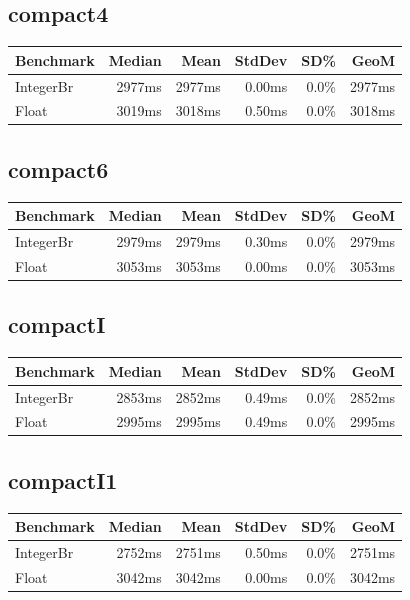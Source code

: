 {\subsection*{compact4}
\begin{tabular}{|l|r|r|r|r|r|}
\hline
\textbf{Benchmark} & \textbf{Median} & \textbf{Mean} & \textbf{StdDev} & \textbf{SD\%} & \textbf{GeoM} \\ \hline
IntegerBr & 2977ms & 2977ms & 0.00ms & 0.0\% & 2977ms \\ \hline
Float & 3019ms & 3018ms & 0.50ms & 0.0\% & 3018ms \\ \hline
\end{tabular}

\subsection*{compact6}
\begin{tabular}{|l|r|r|r|r|r|}
\hline
\textbf{Benchmark} & \textbf{Median} & \textbf{Mean} & \textbf{StdDev} & \textbf{SD\%} & \textbf{GeoM} \\ \hline
IntegerBr & 2979ms & 2979ms & 0.30ms & 0.0\% & 2979ms \\ \hline
Float & 3053ms & 3053ms & 0.00ms & 0.0\% & 3053ms \\ \hline
\end{tabular}

\subsection*{compactI}
\begin{tabular}{|l|r|r|r|r|r|}
\hline
\textbf{Benchmark} & \textbf{Median} & \textbf{Mean} & \textbf{StdDev} & \textbf{SD\%} & \textbf{GeoM} \\ \hline
IntegerBr & 2853ms & 2852ms & 0.49ms & 0.0\% & 2852ms \\ \hline
Float & 2995ms & 2995ms & 0.49ms & 0.0\% & 2995ms \\ \hline
\end{tabular}

\subsection*{compactI1}
\begin{tabular}{|l|r|r|r|r|r|}
\hline
\textbf{Benchmark} & \textbf{Median} & \textbf{Mean} & \textbf{StdDev} & \textbf{SD\%} & \textbf{GeoM} \\ \hline
IntegerBr & 2752ms & 2751ms & 0.50ms & 0.0\% & 2751ms \\ \hline
Float & 3042ms & 3042ms & 0.00ms & 0.0\% & 3042ms \\ \hline
\end{tabular}

}
